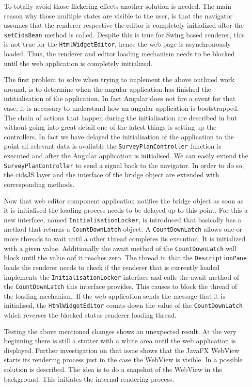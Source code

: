 To totally avoid those flickering effects another solution is needed. 
The main reason why those multiple states are visible to the user, is that the navigator assumes that the renderer respective the editor is completely initialized after the \texttt{setCidsBean} method is called. 
Despite this is true for Swing based renderer, this is not true for the \texttt{HtmlWidgetEditor}, hence the web page is asynchronously loaded. 
Thus, the renderer and editor loading mechanism needs to be blocked until the web application is completely initialized. 

The first problem to solve when trying to implement the above outlined work around, is to determine when the angular application has finished the intitialisation of the application. 
In fact Angular does not fire a event for that case, it is necessary to understand how an angular application is bootstrapped. 
The chain of actions that happen during the initialisation are described in \autocite{impl:ng-bootstrap} but without going into great detail one of the latest things is setting up the controllers. 
In fact we have delayed the initialisation of the application to the point all relevant data is available the \texttt{SurveyPlanController} function is executed and after the Angular application is initialised. We can easily extend the \texttt{SurveyPlanController} to send a signal back to the navigator. 
In order to do so, the cidsJS layer and the interface of the bridge object are extended with corresponding methods.

Now that web editor component application notifies the bridge object as soon as it is initialised the loading process needs to be delayed up to this point. 
For this a new interface, named \texttt{InitialisationLocker}, is introduced that basically has a method that returns a \texttt{CountDownLatch} object. 
A \texttt{CountDownLatch} allows one or more threads to wait until a other thread completes its execution. 
It is initialized with a given value. Additionally the await method of the \texttt{CountDownLatch} will block until the value oof it reaches zero. 
The thread in that the \texttt{DescriptionPane} loads the renderer needs to check if the renderer that is currently loaded implements the \texttt{InitialisationLocker} interface and calls the await method of the \texttt{CountDownLatch} this interface provides.
This causes to block the thread of the loading mechanism. 
If the web application sends the message that it is initialised, the \texttt{HtmlWidgetEditor} counts down the value of the \texttt{CountDownLatch} which reverses the blocked status renderer loading thread. 

Testing the above mentioned changes shows an unexpected result. 
At the very beginning there is still a stutter with a white area until the web application is displayed. 
Further investigation on that issue shows that the JavaFX WebView starts its rendering process just in the case the WebView is visible. 
In \autocite{impl:fx-snapshot} a possible solution is described. 
The idea is to do a snapshot of the WebView in the background. 
This initiates the internal rendering process. 
